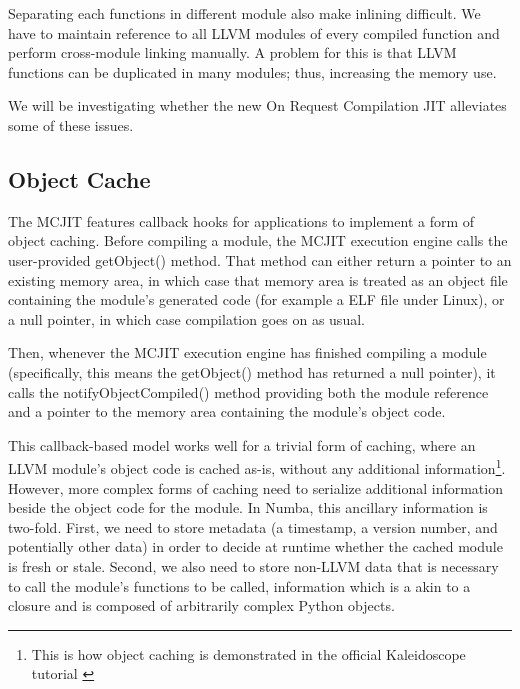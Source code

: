 \documentclass{sig-alternate}
\begin{document}
Separating each functions in different module also make inlining difficult.
We have to maintain reference to all LLVM modules of every compiled function
and perform cross-module linking manually. A problem for this is that
LLVM functions can be duplicated in many modules; thus, increasing the memory
use.

We will be investigating whether the new On Request Compilation JIT
alleviates some of these issues.


\subsection{Object Cache}

The MCJIT features callback hooks for
applications to implement a form of object caching.
Before compiling a module, the MCJIT execution engine
calls the user-provided getObject() method.  That method can either
return a pointer to an existing memory area, in which case that
memory area is treated as an object file containing the module's
generated code (for example a ELF file under Linux), or a null pointer,
in which case compilation goes on as usual.

Then, whenever the MCJIT execution engine has finished compiling a
module (specifically, this means the getObject() method has returned
a null pointer), it calls the notifyObjectCompiled() method providing
both the module reference and a pointer to the memory area containing
the module's object code.

This callback-based model works well for a trivial form of caching,
where an LLVM module's object code is cached as-is, without any
additional information\footnote{This is how object caching is demonstrated in
the official Kaleidoscope tutorial \cite{llvmblog:kaleidoscope}}.
However, more complex forms of
caching need to serialize additional information beside the object code
for the module.  In Numba, this ancillary information is two-fold.  First,
we need to store metadata (a timestamp, a version number,
and potentially other data) in order to decide at runtime whether the
cached module is fresh or stale.  Second, we also need to store non-LLVM
data that is necessary to call the module's functions to be called,
information which is a akin to a closure and is composed of arbitrarily
complex Python objects.
\end{document}
